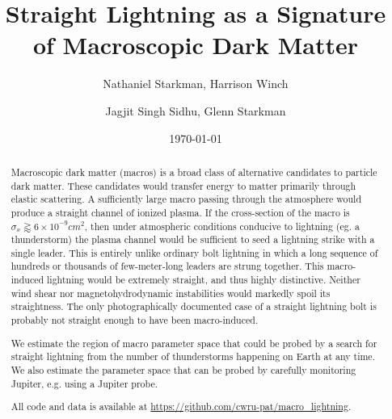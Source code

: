 \documentclass[%
 reprint,
 amsmath,amssymb,
 aps,
]{revtex4-2}
\newcommand{\vtwo}[1]{{\color{red} #1}}
\begin{document}

\title{Straight Lightning as a Signature of Macroscopic Dark Matter}

\author{Nathaniel Starkman, Harrison Winch}%
%

\author{Jagjit Singh Sidhu, Glenn Starkman}

\date{\today}


\begin{abstract}

    Macroscopic dark matter (macros) is a broad class of alternative candidates to particle dark matter. These candidates would transfer energy to matter primarily through elastic scattering. A sufficiently large macro passing through the atmosphere would produce a straight channel of ionized plasma. If the cross-section of the macro is $\sigma_x\gtrapprox6\times10^{-9}cm^2$, then under atmospheric conditions conducive to lightning (eg. a thunderstorm) the plasma channel would be sufficient to seed a lightning strike with a single leader. This is entirely unlike ordinary bolt lightning in which a long sequence of hundreds or thousands of few-meter-long leaders are strung together. This macro-induced lightning would be extremely straight, and thus highly distinctive. Neither wind shear nor magnetohydrodynamic instabilities would markedly spoil its straightness. The only photographically documented case of a straight lightning bolt is probably not straight enough to have been macro-induced.

    We estimate the region of macro parameter space that could be probed by a search for straight lightning from the number of thunderstorms happening on Earth at any time. We also estimate the parameter space that can be probed by carefully monitoring Jupiter, e.g. \vtwo{using a Jupiter probe}.

    All code and data is available at \url{https://github.com/cwru-pat/macro_lightning}.

\end{abstract}
\end{document}
